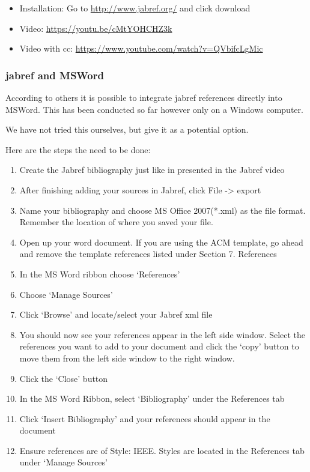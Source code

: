 \begin{itemize}
\tightlist
\item
  Installation: Go to \url{http://www.jabref.org/} and click download
\item
  Video: \url{https://youtu.be/cMtYOHCHZ3k}
\item
  Video with cc: \url{https://www.youtube.com/watch?v=QVbifcLgMic}
\end{itemize}

\subsubsection{jabref and MSWord}\label{jabref-and-msword}

According to others it is possible to integrate jabref references
directly into MSWord. This has been conducted so far however only on a
Windows computer.

We have not tried this ourselves, but give it as a potential option.

Here are the steps the need to be done:

\begin{enumerate}
\def\labelenumi{\arabic{enumi}.}
\tightlist
\item
  Create the Jabref bibliography just like in presented in the Jabref
  video
\item
  After finishing adding your sources in Jabref, click
  File -\textgreater{} export
\item
  Name your bibliography and choose MS Office 2007(*.xml) as the file
  format. Remember the location of where you saved your file.
\item
  Open up your word document. If you are using the ACM template, go
  ahead and remove the template references listed under
  Section 7. References
\item
  In the MS Word ribbon choose `References'
\item
  Choose `Manage Sources'
\item
  Click `Browse' and locate/select your Jabref xml file
\item
  You should now see your references appear in the left side window.
  Select the references you want to add to your document and click the
  `copy' button to move them from the left side window to the right
  window.
\item
  Click the `Close' button
\item
  In the MS Word Ribbon, select `Bibliography' under the References tab
\item
  Click `Insert Bibliography' and your references should appear in the
  document
\item
  Ensure references are of Style: IEEE. Styles are located in the
  References tab under `Manage Sources'
\end{enumerate}

